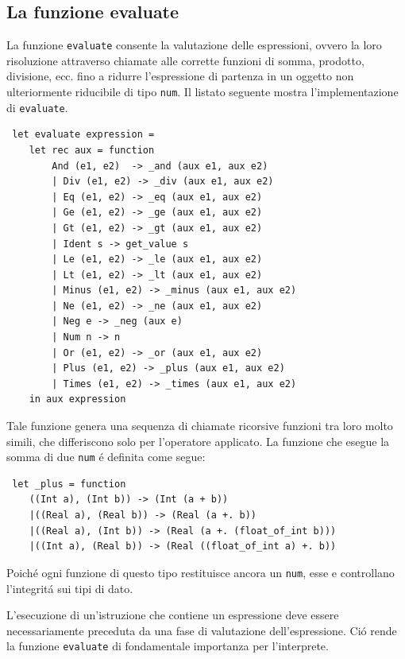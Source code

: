 \documentclass[a4paper,10pt]{article}
\begin{document}
\subsection{La funzione evaluate}
La funzione \texttt{evaluate} consente la valutazione delle espressioni, ovvero
la loro risoluzione attraverso chiamate alle corrette funzioni di somma,
prodotto, divisione, ecc. fino a ridurre l'espressione di partenza in un oggetto
non ulteriormente riducibile di tipo \texttt{num}. Il listato
seguente mostra l'implementazione di \texttt{evaluate}.
\begin{verbatim}
 let evaluate expression =
    let rec aux = function
        And (e1, e2)  -> _and (aux e1, aux e2)
        | Div (e1, e2) -> _div (aux e1, aux e2)
        | Eq (e1, e2) -> _eq (aux e1, aux e2)
        | Ge (e1, e2) -> _ge (aux e1, aux e2)
        | Gt (e1, e2) -> _gt (aux e1, aux e2)
        | Ident s -> get_value s
        | Le (e1, e2) -> _le (aux e1, aux e2)
        | Lt (e1, e2) -> _lt (aux e1, aux e2)
        | Minus (e1, e2) -> _minus (aux e1, aux e2)
        | Ne (e1, e2) -> _ne (aux e1, aux e2)
        | Neg e -> _neg (aux e)
        | Num n -> n
        | Or (e1, e2) -> _or (aux e1, aux e2)
        | Plus (e1, e2) -> _plus (aux e1, aux e2)
        | Times (e1, e2) -> _times (aux e1, aux e2)
    in aux expression
\end{verbatim}
Tale funzione genera una sequenza di chiamate ricorsive funzioni tra
loro molto simili, che differiscono solo per l'operatore applicato. La funzione
che esegue la somma di due \texttt{num} \'e definita come segue:
\begin{verbatim}
 let _plus = function
    ((Int a), (Int b)) -> (Int (a + b))
    |((Real a), (Real b)) -> (Real (a +. b))
    |((Real a), (Int b)) -> (Real (a +. (float_of_int b)))
    |((Int a), (Real b)) -> (Real ((float_of_int a) +. b))
\end{verbatim}
Poich\'e ogni funzione di questo tipo restituisce ancora un \texttt{num}, esse e
controllano l'integrit\'a sui tipi di dato.

L'esecuzione di un'istruzione che contiene un espressione deve essere
necessariamente preceduta da una fase di valutazione dell'espressione. Ci\'o
rende la funzione \texttt{evaluate} di fondamentale importanza per l'interprete.
\end{document}
